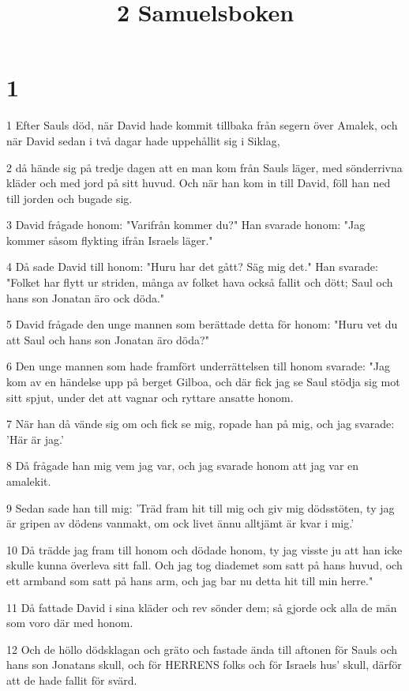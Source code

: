 

\title{2 Samuelsboken}


\chapter{1}

\par 1 Efter Sauls död, när David hade kommit tillbaka från segern över Amalek, och när David sedan i två dagar hade uppehållit sig i Siklag,
\par 2 då hände sig på tredje dagen att en man kom från Sauls läger, med sönderrivna kläder och med jord på sitt huvud. Och när han kom in till David, föll han ned till jorden och bugade sig.
\par 3 David frågade honom: "Varifrån kommer du?" Han svarade honom: "Jag kommer såsom flykting ifrån Israels läger."
\par 4 Då sade David till honom: "Huru har det gått? Säg mig det." Han svarade: "Folket har flytt ur striden, många av folket hava också fallit och dött; Saul och hans son Jonatan äro ock döda."
\par 5 David frågade den unge mannen som berättade detta för honom: "Huru vet du att Saul och hans son Jonatan äro döda?"
\par 6 Den unge mannen som hade framfört underrättelsen till honom svarade: "Jag kom av en händelse upp på berget Gilboa, och där fick jag se Saul stödja sig mot sitt spjut, under det att vagnar och ryttare ansatte honom.
\par 7 När han då vände sig om och fick se mig, ropade han på mig, och jag svarade: 'Här är jag.'
\par 8 Då frågade han mig vem jag var, och jag svarade honom att jag var en amalekit.
\par 9 Sedan sade han till mig: 'Träd fram hit till mig och giv mig dödsstöten, ty jag är gripen av dödens vanmakt, om ock livet ännu alltjämt är kvar i mig.'
\par 10 Då trädde jag fram till honom och dödade honom, ty jag visste ju att han icke skulle kunna överleva sitt fall. Och jag tog diademet som satt på hans huvud, och ett armband som satt på hans arm, och jag bar nu detta hit till min herre."
\par 11 Då fattade David i sina kläder och rev sönder dem; så gjorde ock alla de män som voro där med honom.
\par 12 Och de höllo dödsklagan och gräto och fastade ända till aftonen för Sauls och hans son Jonatans skull, och för HERRENS folks och för Israels hus' skull, därför att de hade fallit för svärd.
